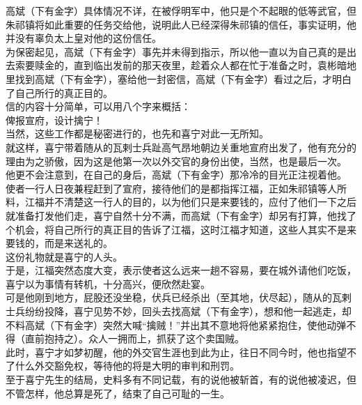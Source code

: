 \begin{multicols}{\theparacolNo}
高斌（下有金字）具体情况不详，在被俘明军中，他只是个不起眼的低等武官，但朱祁镇将如此重要的任务交给他，说明此人已经深得朱祁镇的信任，事实证明，他并没有辜负太上皇对他的这份信任。\\

为保密起见，高斌（下有金字）事先并未得到指示，所以他一直以为自己真的是出去索要赎金的，直到临出发前的那天夜里，趁着众人都在忙于准备之时，袁彬暗地里找到高斌（下有金字），塞给他一封密信，高斌（下有金字）看过之后，才明白了自己所行的真正目的。\\

信的内容十分简单，可以用八个字来概括：\\

俾报宣府，设计擒宁！\\

当然，这些工作都是秘密进行的，也先和喜宁对此一无所知。\\

就这样，喜宁带着随从的瓦剌士兵趾高气昂地朝边关重地宣府出发了，他有充分的理由为之骄傲，因为这是他第一次以外交官的身份出使，当然，也是最后一次。\\

他更不会注意到，在自己的身后，高斌（下有金字）那冷冷的目光正注视着他。\\

使者一行人日夜兼程赶到了宣府，接待他们的是都指挥江福，正如朱祁镇等人所料，江福并不清楚这一行人的目的，以为他们只是来要钱的，应付了他们一下之后就准备打发他们走，喜宁自然十分不满，而高斌（下有金字）却另有打算，他找了个机会，将自己所行的真正目的告诉了江福，这时江福才知道，这些人其实不是来要钱的，而是来送礼的。\\

这份礼物就是喜宁的人头。\\

于是，江福突然态度大变，表示使者这么远来一趟不容易，要在城外请他们吃饭，喜宁以为事情有转机，十分高兴，便欣然赴宴。\\

可是他刚到地方，屁股还没坐稳，伏兵已经杀出（至其地，伏尽起），随从的瓦剌士兵纷纷投降，喜宁见势不妙，回头去找高斌（下有金字），想和他一起逃走，却不料高斌（下有金字）突然大喊“擒贼！”并出其不意地将他紧紧抱住，使他动弹不得（直前抱持之）。众人一拥而上，抓获了这个卖国贼。\\

此时，喜宁才如梦初醒，他的外交官生涯也到此为止，往日不同今时，他也指望不了什么外交豁免权，等待他的将是大明的审判和刑罚。\\

至于喜宁先生的结局，史料多有不同记载，有的说他被斩首，有的说他被凌迟，但不管怎样，他总算是死了，结束了自己可耻的一生。\\


\end{multicols}
